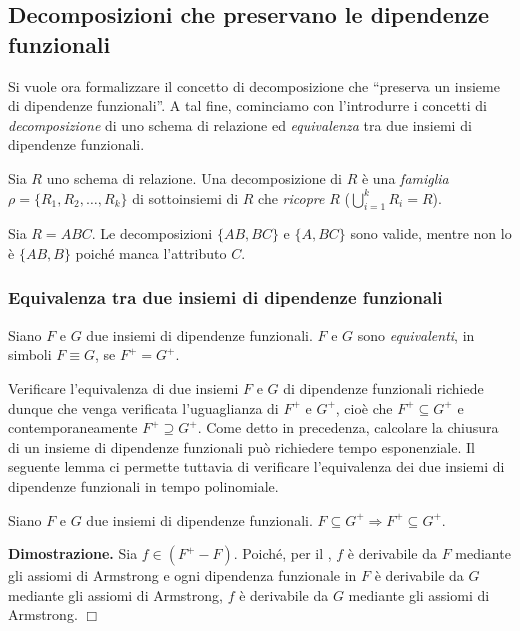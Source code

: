 \subsection{Decomposizioni che preservano le dipendenze funzionali}
Si vuole ora formalizzare il concetto di decomposizione che ``preserva un insieme di dipendenze funzionali''.
A tal fine, cominciamo con l'introdurre i concetti di \emph{decomposizione} di uno schema di relazione ed 
\emph{equivalenza} tra due insiemi di dipendenze funzionali.\\
\begin{defn}
Sia $R$ uno schema di relazione. Una decomposizione di $R$ è una \emph{famiglia} $\rho = \{R_1, R_2, \ldots, 
R_k\}$ di sottoinsiemi di $R$ che \emph{ricopre} $R$ ($\bigcup_{i=1}^k R_i = R$).
\end{defn}
\begin{exmp}
Sia $R = ABC$. Le decomposizioni $\{AB, BC\}$ e $\{A, BC\}$ sono valide, mentre non lo è $\{AB, B\}$ poiché
manca l'attributo $C$.
\end{exmp}

\subsubsection{Equivalenza tra due insiemi di dipendenze funzionali}
\begin{defn}
Siano $F$ e $G$ due insiemi di dipendenze funzionali. $F$ e $G$ sono \emph{equivalenti}, in simboli $F \equiv 
G$, se $F^+ = G^+$.
\end{defn}
Verificare l'equivalenza di due insiemi $F$ e $G$ di dipendenze funzionali richiede dunque che venga verificata
l'uguaglianza di $F^+$ e $G^+$, cioè che $F^+ \subseteq G^+$ e contemporaneamente $F^+ \supseteq G^+$. Come 
detto in precedenza, calcolare la chiusura di un insieme di dipendenze funzionali può richiedere tempo 
esponenziale. Il seguente lemma ci permette tuttavia di verificare l'equivalenza dei due insiemi di dipendenze
funzionali in tempo polinomiale.
\label{lemma4_2}
\begin{lem}
Siano $F$ e $G$ due insiemi di dipendenze funzionali. $F \subseteq G^+ \Rightarrow F^+ \subseteq G^+$. 
\end{lem}
\textbf{Dimostrazione.} Sia $f \in (F^+ -F)$. Poiché, per il , $f$ è derivabile
da $F$ mediante gli assiomi di Armstrong e ogni dipendenza funzionale in $F$ è derivabile da $G$ mediante gli 
assiomi di Armstrong, $f$ è derivabile da $G$ mediante gli assiomi di Armstrong. \hfill $\Box$

